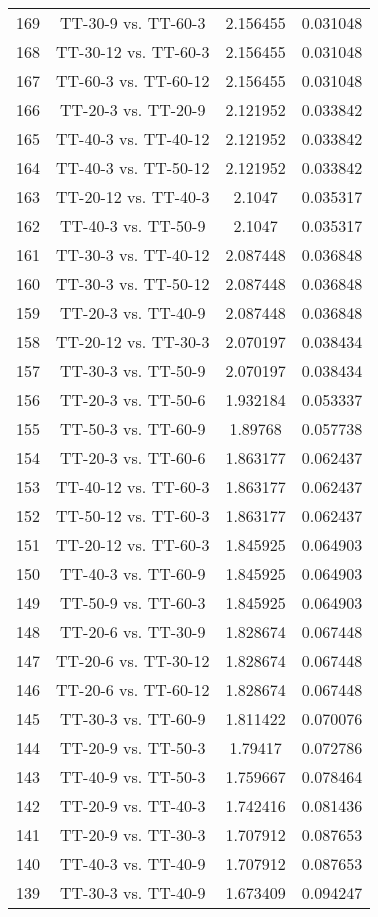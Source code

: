 \documentclass[a4paper,10pt]{article}
\begin{document}
\begin{landscape}
\begin{table}[!htp]
\begin{tabular}{cccc}
169&TT-30-9 vs. TT-60-3&2.156455&0.031048\\
168&TT-30-12 vs. TT-60-3&2.156455&0.031048\\
167&TT-60-3 vs. TT-60-12&2.156455&0.031048\\
166&TT-20-3 vs. TT-20-9&2.121952&0.033842\\
165&TT-40-3 vs. TT-40-12&2.121952&0.033842\\
164&TT-40-3 vs. TT-50-12&2.121952&0.033842\\
163&TT-20-12 vs. TT-40-3&2.1047&0.035317\\
162&TT-40-3 vs. TT-50-9&2.1047&0.035317\\
161&TT-30-3 vs. TT-40-12&2.087448&0.036848\\
160&TT-30-3 vs. TT-50-12&2.087448&0.036848\\
159&TT-20-3 vs. TT-40-9&2.087448&0.036848\\
158&TT-20-12 vs. TT-30-3&2.070197&0.038434\\
157&TT-30-3 vs. TT-50-9&2.070197&0.038434\\
156&TT-20-3 vs. TT-50-6&1.932184&0.053337\\
155&TT-50-3 vs. TT-60-9&1.89768&0.057738\\
154&TT-20-3 vs. TT-60-6&1.863177&0.062437\\
153&TT-40-12 vs. TT-60-3&1.863177&0.062437\\
152&TT-50-12 vs. TT-60-3&1.863177&0.062437\\
151&TT-20-12 vs. TT-60-3&1.845925&0.064903\\
150&TT-40-3 vs. TT-60-9&1.845925&0.064903\\
149&TT-50-9 vs. TT-60-3&1.845925&0.064903\\
148&TT-20-6 vs. TT-30-9&1.828674&0.067448\\
147&TT-20-6 vs. TT-30-12&1.828674&0.067448\\
146&TT-20-6 vs. TT-60-12&1.828674&0.067448\\
145&TT-30-3 vs. TT-60-9&1.811422&0.070076\\
144&TT-20-9 vs. TT-50-3&1.79417&0.072786\\
143&TT-40-9 vs. TT-50-3&1.759667&0.078464\\
142&TT-20-9 vs. TT-40-3&1.742416&0.081436\\
141&TT-20-9 vs. TT-30-3&1.707912&0.087653\\
140&TT-40-3 vs. TT-40-9&1.707912&0.087653\\
139&TT-30-3 vs. TT-40-9&1.673409&0.094247\\

\end{tabular}
\end{table}
\end{landscape}
\end{document}

